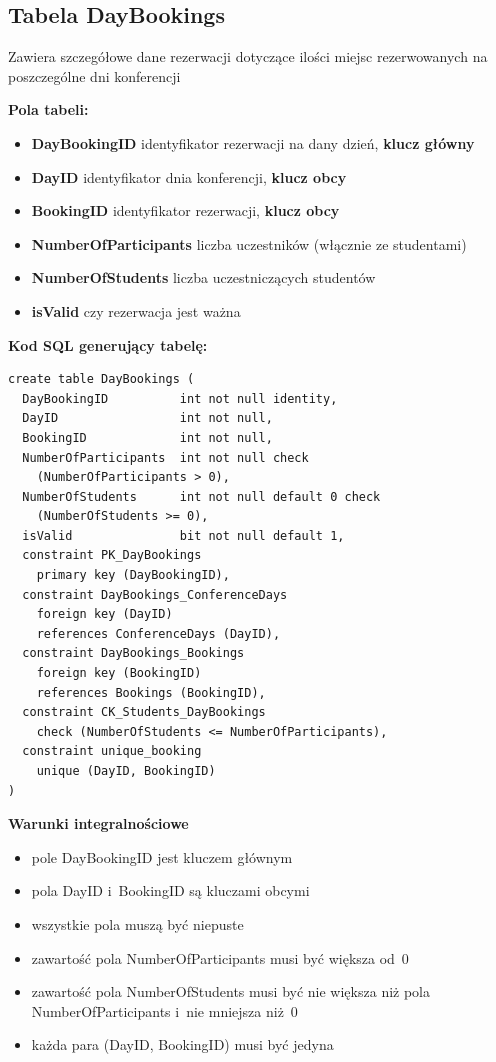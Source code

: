 \documentclass[12pt, a4paper]{mwrep}
\begin{document}
\subsection{Tabela DayBookings}

\noindent Zawiera szczegółowe dane rezerwacji dotyczące ilości miejsc rezerwowanych na poszczególne dni konferencji

\vspace{0.5cm}

\noindent \textbf{Pola tabeli:}
\begin{itemize}
  \item \textbf{DayBookingID} \ppauza identyfikator rezerwacji na dany dzień, \textbf{klucz główny}
  \item \textbf{DayID} \ppauza identyfikator dnia konferencji, \textbf{klucz obcy}
  \item \textbf{BookingID} \ppauza identyfikator rezerwacji, \textbf{klucz obcy}
  \item \textbf{NumberOfParticipants} \ppauza liczba uczestników (włącznie ze studentami)
  \item \textbf{NumberOfStudents} \ppauza liczba uczestniczących studentów
  \item \textbf{isValid} \ppauza czy rezerwacja jest ważna
\end{itemize}

\vspace{0.5cm}
\noindent \textbf{Kod SQL generujący tabelę:}

\begin{lstlisting}
create table DayBookings (
  DayBookingID          int not null identity,
  DayID                 int not null,
  BookingID             int not null,
  NumberOfParticipants  int not null check
    (NumberOfParticipants > 0),
  NumberOfStudents      int not null default 0 check
    (NumberOfStudents >= 0),
  isValid               bit not null default 1,
  constraint PK_DayBookings 
    primary key (DayBookingID),
  constraint DayBookings_ConferenceDays 
    foreign key (DayID) 
    references ConferenceDays (DayID),
  constraint DayBookings_Bookings 
    foreign key (BookingID) 
    references Bookings (BookingID),
  constraint CK_Students_DayBookings 
    check (NumberOfStudents <= NumberOfParticipants),
  constraint unique_booking 
    unique (DayID, BookingID)
)
\end{lstlisting}

\vspace{0.5cm}
\noindent \textbf{Warunki integralnościowe}
\begin{itemize}
  \item pole DayBookingID jest kluczem głównym
  \item pola DayID i~BookingID są kluczami obcymi
  \item wszystkie pola muszą być niepuste
  \item zawartość pola NumberOfParticipants musi być większa od~0  
  \item zawartość pola NumberOfStudents musi być nie większa niż pola NumberOfParticipants i~nie mniejsza niż~0
  \item każda para (DayID, BookingID) musi być jedyna
\end{itemize}
\end{document}
